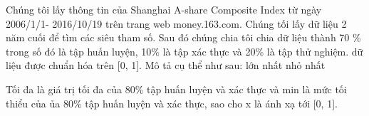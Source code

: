 Chúng tôi lấy thông tin của Shanghai A-share Composite Index từ ngày 2006/1/1- 2016/10/19 trên trang web money.163.com. Chúng tối lấy dữ liệu 2 năm cuối để tìm các siêu tham số. Sau đó chúng chia tôi chia dữ liệu thành 70 \% trong số đó là tập huấn luyện, 10\% là tập xác thực và 20\% là tập thử nghiệm. dữ liệu được chuẩn hóa trên [0, 1].
Mô tả cụ thể như sau:
lớn nhất nhỏ nhất

Tối đa là giá trị tối đa của 80\% tập huấn luyện và xác thực và min là mức tối thiểu của ủa 80\% tập huấn luyện và xác thực, sao cho x là
ánh xạ tới [0, 1].